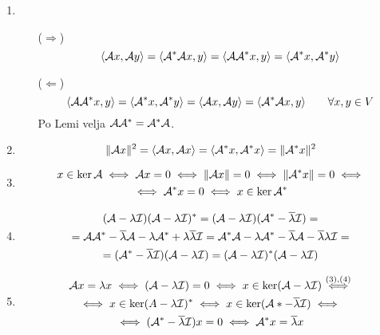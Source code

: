 \begin{enumerate}
    \item
    \begin{itemize}
        \item[($\Rightarrow$)]
        \begin{equation*}
        \langle \mathcal{A} x, \mathcal{A} y \rangle = \langle \mathcal{A}^* \mathcal{A} x, y \rangle = \langle \mathcal{A} \mathcal{A}^* x, y \rangle = \langle \mathcal{A}^* x, \mathcal{A}^* y \rangle
        \end{equation*}
        
        \item[($\Leftarrow$)]
        \begin{equation*}
        \langle \mathcal{A} \mathcal{A}^* x, y \rangle = \langle \mathcal{A}^* x, \mathcal{A}^* y \rangle = \langle \mathcal{A} x, \mathcal{A} y \rangle = \langle \mathcal{A}^* \mathcal{A} x, y \rangle \qquad \forall x, y \in V
        \end{equation*}
        Po Lemi velja $\mathcal{A} \mathcal{A}^* = \mathcal{A}^* \mathcal{A}$.
    \end{itemize}

    \item 
    \begin{equation*}
    \| \mathcal{A} x \|^2 = \langle \mathcal{A} x, \mathcal{A} x \rangle = \langle \mathcal{A}^* x, \mathcal{A}^* x \rangle = \| \mathcal{A}^* x \|^2
    \end{equation*}
    
    \item
    \begin{multline*}
    x \in \ker \mathcal{A} \iff \mathcal{A} x = 0 \iff \| \mathcal{A} x \| = 0 \iff \| \mathcal{A}^* x \| = 0 \iff \\
    \iff \mathcal{A}^* x = 0 \iff x \in \ker \mathcal{A}^*
    \end{multline*}
    
    \item
    \begin{multline*}
    (\mathcal{A} - \lambda \mathcal{I}) (\mathcal{A} - \lambda \mathcal{I})^* = (\mathcal{A} - \lambda \mathcal{I}) (\mathcal{A}^* - \overline{\lambda} \mathcal{I} ) = \\
    = \mathcal{A} \mathcal{A}^* - \overline{\lambda} \mathcal{A} - \lambda \mathcal{A}^* + \lambda \overline{\lambda} \mathcal{I} = \mathcal{A}^* \mathcal{A} - \lambda \mathcal{A}^* - \overline{\lambda} \mathcal{A} - \overline{\lambda}\lambda \mathcal{I} = \\
    = (\mathcal{A}^* - \overline{\lambda} \mathcal{I}) (\mathcal{A} - \lambda \mathcal{I}) = (\mathcal{A} - \lambda \mathcal{I})^* (\mathcal{A} - \lambda \mathcal{I})
    \end{multline*}
    
    \item
    \begin{multline*}
    \mathcal{A} x = \lambda x \iff (\mathcal{A} - \lambda \mathcal{I} ) = 0 \iff x \in \ker (\mathcal{A} - \lambda \mathcal{I}) \stackrel{(3), (4)}{\iff} \\
    \iff x \in \ker(A - \lambda \mathcal{I})^* \iff x \in \ker (\mathcal{A}* - \overline{\lambda} \mathcal{I})  \iff \\
    \iff (\mathcal{A}^* - \overline{\lambda} \mathcal{I})x = 0 \iff \mathcal{A}^* x = \overline{\lambda} x
    \end{multline*}
    

\end{enumerate}
